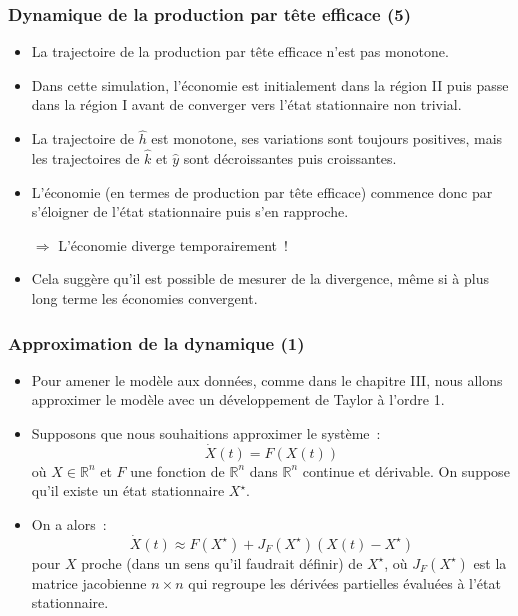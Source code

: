 \documentclass[10pt,notheorems]{beamer}
\theoremstyle{plain}
\theoremstyle{definition} %
\begin{document}
\begin{frame}
  \frametitle{Dynamique de la production par tête efficace (5)}

  \begin{itemize}

  \item La trajectoire de la production par tête efficace n'est pas monotone.\newline

  \item Dans cette simulation, l'économie est initialement dans la région II puis passe dans la région I avant de converger vers l'état stationnaire non trivial.\newline

  \item La trajectoire de $\hat h$ est monotone, ses variations sont toujours positives, mais les trajectoires de $\hat k$ et $\hat y$ sont décroissantes puis croissantes.\newline

  \item L'économie (en termes de production par tête efficace) commence donc par s'éloigner de l'état stationnaire puis s'en rapproche.\newline

  \item[$\Rightarrow$] L'économie diverge temporairement~!\newline

  \item Cela suggère qu'il est possible de mesurer de la divergence, même si à plus long terme les économies convergent.

  \end{itemize}
\end{frame}


\begin{frame}
  \frametitle{Approximation de la dynamique (1)}

  \begin{itemize}

  \item Pour amener le modèle aux données, comme dans le chapitre III, nous allons approximer le modèle avec un développement de Taylor à l'ordre 1.\newline

  \item Supposons que nous souhaitions approximer le système~:
    \[
      \dot X(t) = F(X(t))
    \]
    où $X\in\mathbb R^n$ et $F$ une fonction de $\mathbb R^n$ dans $\mathbb R^n$ continue et dérivable. On suppose qu'il existe un état stationnaire $X^\star$.\newline

  \item On a alors~:
    \[
      \dot X(t) \approx F(X^\star) + J_F(X^\star)(X(t)-X^\star)
    \]
    pour $X$ proche (dans un sens qu'il faudrait définir) de $X^\star$, où $J_F(X^\star)$ est la matrice jacobienne $n\times n$ qui regroupe les dérivées partielles évaluées à l'état stationnaire.

  \end{itemize}
\end{frame}
\end{document}

